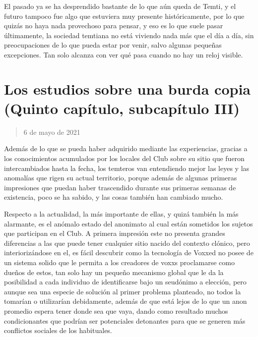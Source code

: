 \documentclass[
  spanish,
]{book}
\begin{document}
El pasado ya se ha desprendido bastante de lo que aún queda de Temti, y el futuro tampoco fue algo que estuviera muy presente históricamente, por lo que quizás no haya nada provechoso para pensar, y eso es lo que suele pasar últimamente, la sociedad temtiana no está viviendo nada más que el día a día, sin preocupaciones de lo que pueda estar por venir, salvo algunas pequeñas excepciones. Tan solo alcanza con ver qué pasa cuando no hay un reloj visible.

\hypertarget{los-estudios-sobre-una-burda-copia-quinto-capuxedtulo-subcapuxedtulo-iii}{%
\section{Los estudios sobre una burda copia (Quinto capítulo, subcapítulo III)}\label{los-estudios-sobre-una-burda-copia-quinto-capuxedtulo-subcapuxedtulo-iii}}

\begin{quote}
6 de mayo de 2021
\end{quote}

Además de lo que se pueda haber adquirido mediante las experiencias, gracias a los conocimientos acumulados por los locales del Club sobre su sitio que fueron intercambiados hasta la fecha, los temteros van entendiendo mejor las leyes y las anomalías que rigen su actual territorio, porque además de algunas primeras impresiones que puedan haber trascendido durante sus primeras semanas de existencia, poco se ha sabido, y las cosas también han cambiado mucho.

Respecto a la actualidad, la más importante de ellas, y quizá también la más alarmante, es el anómalo estado del anonimato al cual están sometidos los sujetos que participan en el Club. A primera impresión este no presenta grandes diferencias a las que puede tener cualquier sitio nacido del contexto clónico, pero interiorizándose en el, es fácil descubrir como la tecnología de Voxxed no posee de un sistema solido que le permita a los creadores de voxxs proclamarse como dueños de estos, tan solo hay un pequeño mecanismo global que le da la posibilidad a cada individuo de identificarse bajo un seudónimo a elección, pero aunque sea una especie de solución al primer problema planteado, no todos la tomarían o utilizarían debidamente, además de que está lejos de lo que un anon promedio espera tener donde sea que vaya, dando como resultado muchos condicionantes que podrían ser potenciales detonantes para que se generen más conflictos sociales de los habituales.
\end{document}
